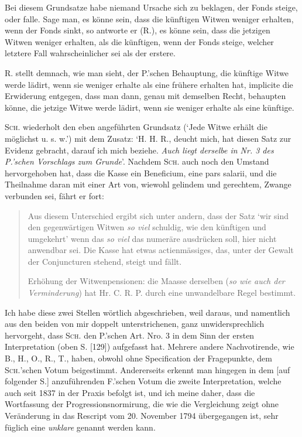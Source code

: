 \par{}
Bei diesem Grundsatze habe niemand Ursache sich zu beklagen, der Fonds steige, oder falle. Sage man, es könne sein, dass die künftigen Witwen weniger erhalten, wenn der Fonds sinkt, so antworte er (R.), es könne sein, dass die jetzigen Witwen weniger erhalten, als die künftigen, wenn der Fonds steige, welcher letztere Fall wahrscheinlicher sei als der erstere.

R. stellt demnach, wie man sieht, der P.’schen Behauptung, die künftige Witwe werde lädirt, wenn sie weniger erhalte als eine frühere erhalten hat, implicite die Erwiderung entgegen, dass man dann, genau mit demselben Recht, behaupten könne, die jetzige Witwe werde lädirt, wenn sie weniger erhalte als eine künftige.

\textsc{Sch.} wiederholt den eben angeführten Grundsatz (‘Jede Witwe erhält die möglichst u. s. w.’) mit dem Zusatz: ‘H. H. R., deucht mich, hat diesen Satz zur Evidenz gebracht, darauf ich mich beziehe. \textit{Auch liegt derselbe in Nr. 3 des P.’schen Vorschlags zum Grunde}’. Nachdem \textsc{Sch.} auch noch den Umstand hervorgehoben hat, dass die Kasse ein Beneficium, eine pars salarii, und die Theilnahme daran mit einer Art von, wiewohl gelindem und gerechtem, Zwange verbunden sei, fährt er fort:
\begin{quote}
Aus diesem Unterschied ergibt sich unter andern, dass der Satz ‘wir sind den gegenwärtigen Witwen \textit{so viel} schuldig, wie den künftigen und umgekehrt’ wenn das \textit{so viel} das numeräre ausdrücken soll, hier nicht anwendbar sei. Die Kasse hat etwas actienmässiges, das, unter der Gewalt der Conjuncturen stehend, steigt und fällt.

Erhöhung der Witwenpensionen: die Maasse derselben (\textit{so wie auch der Verminderung}) hat Hr. C. R. P. durch eine unwandelbare Regel bestimmt.
\end{quote}
\noindent Ich habe diese zwei Stellen wörtlich abgeschrieben, weil daraus, und namentlich aus den beiden von mir doppelt unterstrichenen, ganz unwidersprechlich hervorgeht, dass \textsc{Sch.} den P.’schen Art. Nro. 3 in dem Sinn der ersten Interpretation (oben S. [129]) aufgefasst hat. Mehrere andere Nachvotirende, wie B., H., O., R., T., haben, obwohl ohne Specification der Fragepunkte, dem \textsc{Sch.}’schen Votum beigestimmt. Andererseits erkennt man hingegen in dem [auf folgender S.] anzuführenden F.’schen Votum die zweite Interpretation, welche auch seit 1837 in der Praxis befolgt ist, und ich meine daher, dass die Wortfassung der Progressionsnormirung, die wie die Vergleichung zeigt ohne Veränderung in das Rescript vom 20. November 1794 übergegangen ist, sehr füglich eine \textit{unklare} genannt werden kann.

